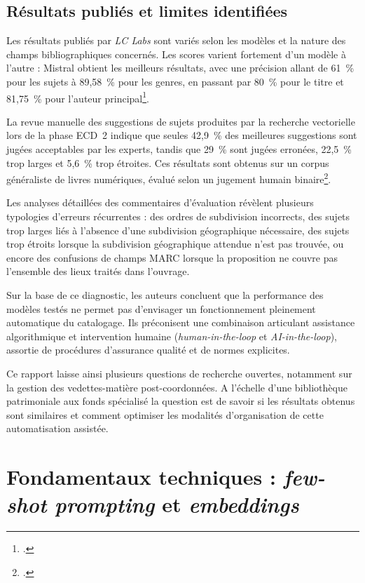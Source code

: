 \subsection{Résultats publiés et limites identifiées}
\label{sec:lc-labs-resultats}

Les résultats publiés par \textit{LC Labs} sont variés selon les modèles et la nature des champs bibliographiques concernés. Les scores varient fortement d'un modèle à l'autre : Mistral obtient les meilleurs résultats, avec une précision allant de 61~\% pour les sujets à 89,58~\% pour les genres, en passant par 80~\% pour le titre et 81,75~\% pour l'auteur principal\footcite{saccucci2025}.

La revue manuelle des suggestions de sujets produites par la recherche vectorielle lors de la phase ECD~2 indique que seules 42,9~\% des meilleures suggestions sont jugées acceptables par les experts, tandis que 29~\% sont jugées erronées, 22,5~\% trop larges et 5,6~\% trop étroites. Ces résultats sont obtenus sur un corpus généraliste de livres numériques, évalué selon un jugement humain binaire\footcite{saccucci2025}.

Les analyses détaillées des commentaires d'évaluation révèlent plusieurs typologies d'erreurs récurrentes : des ordres de subdivision incorrects, des sujets trop larges liés à l'absence d'une subdivision géographique nécessaire, des sujets trop étroits lorsque la subdivision géographique attendue n'est pas trouvée, ou encore des confusions de champs MARC lorsque la proposition ne couvre pas l'ensemble des lieux traités dans l'ouvrage.

Sur la base de ce diagnostic, les auteurs concluent que la performance des modèles testés ne permet pas d'envisager un fonctionnement pleinement automatique du catalogage. Ils préconisent une combinaison articulant assistance algorithmique et intervention humaine (\textit{human-in-the-loop} et \textit{AI-in-the-loop}), assortie de procédures d'assurance qualité et de normes explicites.

Ce rapport laisse ainsi plusieurs questions de recherche ouvertes, notamment sur la gestion des vedettes-matière post-coordonnées. A l'échelle d'une bibliothèque patrimoniale aux fonds spécialisé la question est de savoir si les résultats obtenus sont similaires et comment optimiser les modalités d'organisation de cette automatisation assistée.


\section{Fondamentaux techniques : \textit{few-shot prompting} et \textit{embeddings}}
\label{sec:fondamentaux-techniques}

